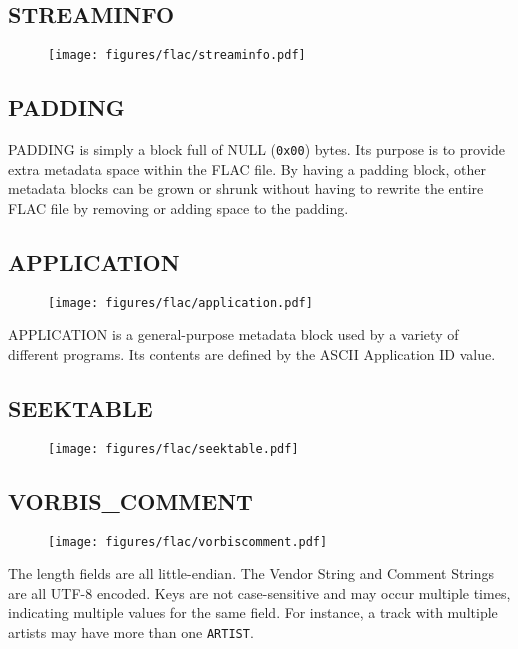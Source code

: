\subsection{STREAMINFO}
\begin{figure}[h]
\texttt{[image: figures/flac/streaminfo.pdf]}
\end{figure}

\subsection{PADDING}

PADDING is simply a block full of NULL (\texttt{0x00}) bytes.
Its purpose is to provide extra metadata space within the FLAC file.
By having a padding block, other metadata blocks can be grown or
shrunk without having to rewrite the entire FLAC file by removing or
adding space to the padding.


\subsection{APPLICATION}
\begin{figure}[h]
\texttt{[image: figures/flac/application.pdf]}
\end{figure}
\noindent
APPLICATION is a general-purpose metadata block used by a variety of
different programs.
Its contents are defined by the ASCII Application ID value.

\subsection{SEEKTABLE}
\begin{figure}[h]
\texttt{[image: figures/flac/seektable.pdf]}
\end{figure}

\pagebreak

\subsection{VORBIS\_COMMENT}
\begin{figure}[h]
\texttt{[image: figures/flac/vorbiscomment.pdf]}
\end{figure}
\par
\noindent
The length fields are all little-endian.
The Vendor String and Comment Strings are all UTF-8 encoded.
Keys are not case-sensitive and may occur multiple times,
indicating multiple values for the same field.
For instance, a track with multiple artists may have
more than one \texttt{ARTIST}.

